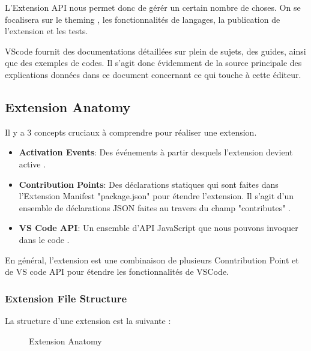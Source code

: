 \documentclass[
    iict, %
    il, %
]{heig-tb}
\begin{document}
L'Extension API nous permet donc de gérér un certain nombre de choses.
On se focalisera sur le theming , les fonctionnalités de langages, la publication de l'extension et les tests.

VScode fournit des documentations détaillées sur plein de sujets, des guides, ainsi que des exemples de codes.
Il s'agit donc évidemment de la source principale des explications données dans ce document concernant ce qui touche à cette éditeur.

\subsection{Extension Anatomy}
Il y a 3 concepts cruciaux à comprendre pour réaliser une extension.

\begin{itemize}
    \item \textbf{Activation Events}: Des événements à partir desquels l'extension devient active \cite{activation-events}.
    \item \textbf{Contribution Points}: Des déclarations statiques qui sont faites dans l'Extension Manifest "package.json" pour étendre l'extension. Il s'agit d'un ensemble de déclarations JSON faites au travers du champ "contributes" \cite{contribution-points}.
    \item \textbf{VS Code API}: Un ensemble d'API JavaScript que nous pouvons invoquer dans le code \cite{vs-code-api}.
\end{itemize}

En général, l'extension est une combinaison de plusieurs Conntribution Point et de VS code API pour étendre les fonctionnalités de VSCode.

\subsubsection{Extension File Structure}\label{Extension File Structure}
La structure d'une extension est la suivante :

\begin{figure}[!h]
    \begin{center}
    \end{center}
    \caption[Extension Anatomy]{\label{extension-anatomy} Extension Anatomy}
\end{figure}
\end{document}

